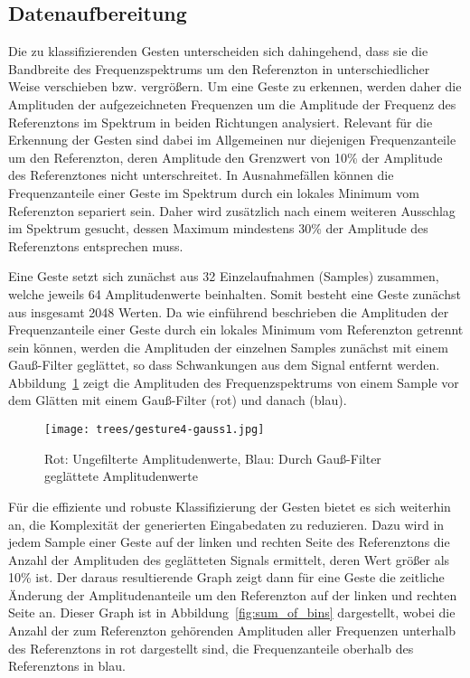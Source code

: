 \subsection{Datenaufbereitung}
\label{sect:Trees_Datenaufbereitung}
Die zu klassifizierenden Gesten unterscheiden sich dahingehend, dass sie die Bandbreite 
des Frequenzspektrums um den Referenzton in unterschiedlicher Weise verschieben bzw. vergrößern. 
Um eine Geste zu erkennen, werden daher die Amplituden der aufgezeichneten Frequenzen 
um die Amplitude der Frequenz des Referenztons im Spektrum in beiden Richtungen analysiert. 
Relevant für die Erkennung der Gesten sind dabei im Allgemeinen nur diejenigen Frequenzanteile 
um den Referenzton, deren Amplitude den Grenzwert von 10\% der Amplitude des Referenztones nicht unterschreitet. 
In Ausnahmefällen können die Frequenzanteile einer Geste im Spektrum durch ein lokales Minimum vom Referenzton 
separiert sein. Daher wird zusätzlich nach einem weiteren Ausschlag im Spektrum gesucht, 
dessen Maximum mindestens 30\% der Amplitude des Referenztons entsprechen muss.


Eine Geste setzt sich zunächst aus 32 Einzelaufnahmen (Samples) zusammen, welche jeweils 
64 Amplitudenwerte beinhalten. Somit besteht eine Geste zunächst aus insgesamt 2048 Werten.
Da wie einführend beschrieben die Amplituden der Frequenzanteile einer Geste durch ein lokales Minimum vom Referenzton 
getrennt sein können, werden die Amplituden der einzelnen Samples zunächst mit einem Gauß-Filter geglättet, 
so dass Schwankungen aus dem Signal entfernt werden. 
Abbildung~\ref{fig:gauss} zeigt die Amplituden des Frequenzspektrums von einem Sample 
vor dem Glätten mit einem Gauß-Filter (rot) und danach (blau).

\begin{figure}[htbp] \centering
\texttt{[image: trees/gesture4-gauss1.jpg]}
\caption{Rot: Ungefilterte Amplitudenwerte, Blau: Durch Gauß-Filter geglättete Amplitudenwerte}
\label{fig:gauss}
\end{figure}

Für die effiziente und robuste Klassifizierung der Gesten bietet es sich weiterhin an, 
die Komplexität der generierten Eingabedaten zu reduzieren. Dazu wird in jedem Sample einer Geste 
auf der linken und rechten Seite des Referenztons die Anzahl der Amplituden des geglätteten Signals ermittelt, 
deren Wert größer als 10\% ist. Der daraus resultierende Graph zeigt dann für eine Geste die zeitliche 
Änderung der Amplitudenanteile um den Referenzton auf der linken und rechten Seite an. Dieser Graph ist in Abbildung~\ref{fig:sum_of_bins} dargestellt, wobei die Anzahl der zum Referenzton gehörenden Amplituden aller Frequenzen unterhalb des
Referenztons in rot dargestellt sind, die Frequenzanteile oberhalb des Referenztons in blau.

